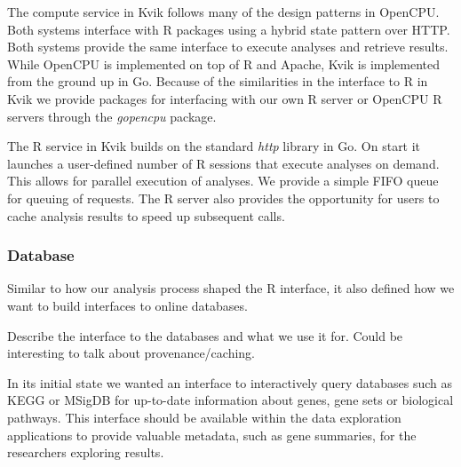 The compute service in Kvik follows many of the design patterns in
OpenCPU. Both systems interface with R packages using a hybrid state pattern
over HTTP. Both systems provide the same interface to execute analyses and
retrieve results.  While OpenCPU is implemented on top of R and Apache, Kvik is
implemented from the ground up in Go. Because of the similarities in the
interface to R in Kvik we provide packages for interfacing with our own R server
or OpenCPU R servers through the \emph{gopencpu} package. 

The R service in Kvik builds on the standard \emph{http} library in Go. On start
it launches a user-defined number of R sessions that execute analyses on demand.
This allows for parallel execution of analyses. We provide a simple FIFO queue
for queuing of requests. The R server also provides the opportunity for users to
cache analysis results to speed up subsequent calls. 

\subsubsection*{Database} 
Similar to how our analysis process shaped the R interface, it also defined how
we want to build interfaces to online databases. 

Describe the interface to the databases and what we use it for. Could be
interesting to talk about provenance/caching.



In its initial state we wanted an interface to interactively query databases
such as KEGG or MSigDB for up-to-date information about genes, gene sets or
biological pathways. This interface should be available within the data
exploration applications to provide valuable metadata, such as gene summaries,
for the researchers exploring results.  





